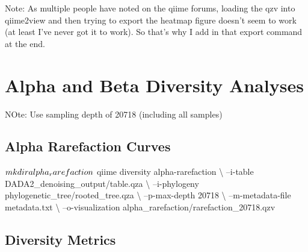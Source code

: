 \documentclass[]{book}
\newenvironment{Shaded}{\begin{snugshade}}{\end{snugshade}}
\newcommand{\ExtensionTok}[1]{#1}
\newcommand{\FunctionTok}[1]{\textcolor[rgb]{0.00,0.00,0.00}{#1}}
\newcommand{\NormalTok}[1]{#1}
\begin{document}
Note: As multiple people have noted on the qiime forums, loading the qzv into qiime2view and then trying to export the heatmap figure doesn't seem to work (at least I've never got it to work). So that's why I add in that export command at the end.

\hypertarget{alpha-and-beta-diversity-analyses}{%
\chapter{Alpha and Beta Diversity Analyses}\label{alpha-and-beta-diversity-analyses}}

NOte: Use sampling depth of 20718 (including all samples)

\hypertarget{alpha-rarefaction-curves}{%
\section{Alpha Rarefaction Curves}\label{alpha-rarefaction-curves}}

\begin{Shaded}
\begin{Highlighting}[]
\NormalTok{$ }\FunctionTok{mkdir}\NormalTok{ alpha_rarefaction}

\NormalTok{$ }\ExtensionTok{qiime}\NormalTok{ diversity alpha-rarefaction \textbackslash{}}
\NormalTok{--i-table DADA2_denoising_output/table.qza \textbackslash{}}
\NormalTok{--i-phylogeny phylogenetic_tree/rooted_tree.qza \textbackslash{}}
\NormalTok{--p-max-depth 20718 \textbackslash{}}
\NormalTok{--m-metadata-file metadata.txt \textbackslash{}}
\NormalTok{--o-visualization alpha_rarefaction/rarefaction_20718.qzv}
\end{Highlighting}
\end{Shaded}

\hypertarget{diversity-metrics}{%
\section{Diversity Metrics}\label{diversity-metrics}}

\begin{Shaded}
\end{Shaded}
\end{document}
